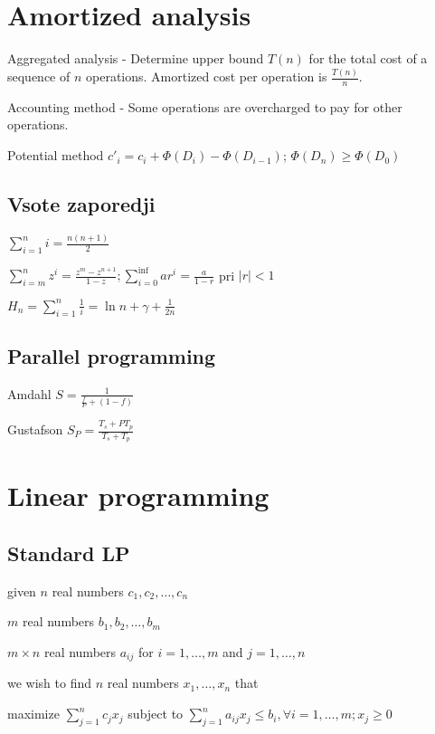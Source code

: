 \documentclass{article}
\begin{document}
\begin{multicols*}{2}
{\section{Amortized analysis}
\begin{compactitem}
	\item Aggregated analysis -
	Determine upper bound $T(n)$ for the total cost of a sequence of $n$ operations.
	Amortized cost per operation is $\frac{T(n)}{n}$.
	\item Accounting method -
	Some operations are overcharged to pay for other operations.
	\item Potential method 
	$c'_i = c_i + \Phi(D_i) - \Phi({D_{i - 1}})$;
	$\Phi(D_n) \geq \Phi(D_0)$
\end{compactitem}

\subsection{Vsote zaporedji}
\begin{compactitem}
	\item $\sum_{i=1}^{n}i=\frac{n(n+1)}{2}$
	\item $\sum_{i=m}^{n}z^i=\frac{z^m-z^{n+1}}{1-z}; \sum_{i=0}^{\inf}ar^i = \frac{a}{1 - r}$ pri $|r| < 1$
	\item $H_n = \sum_{i=1}^{n}\frac{1}{i} = \ln n + \gamma + \frac{1}{2n}$
\end{compactitem}

\subsection{Parallel programming}

\begin{compactitem}
	\item Amdahl $S = \frac{1}{\frac{f}{P}+(1-f)}$
	\item Gustafson $S_P = \frac{T_s + P T_p}{T_s + T_p}$
\end{compactitem}

\section{Linear programming}
\subsection{Standard LP}
\begin{compactitem}
	\item given $n$ real numbers $c_1,c_2,\ldots,c_n$
	\item $m$ real numbers $b_1,b_2,\ldots,b_m$
	\item $m\times n$ real numbers $a_{ij}$ for $i=1,\ldots,m$ and $j=1,\ldots,n$
	\item we wish to find $n$ real numbers $x_1,\ldots,x_n$ that
\end{compactitem}
maximize $\sum_{j=1}^nc_jx_j$ subject to
$\sum_{j=1}^na_{ij}x_j\leq b_i, \forall i=1,\ldots,m; x_j\geq 0$

}
\end{multicols*}
\end{document}
